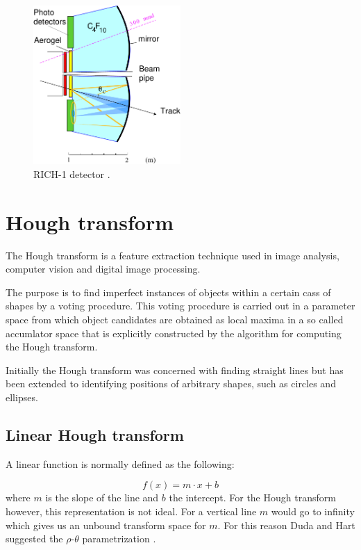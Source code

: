 \documentclass[11pt,twoside]{scrreprt}
\begin{document}
\begin{figure}[tb]
  \centering
  \includegraphics[width=0.5\textwidth]{pics/rich1_schematic}
  \caption{RICH-1 detector \cite{LHCb:2000}.}
  \label{fig:rich1}
\end{figure}



\section{Hough transform} %
\label{sec:hough_transform}

The Hough transform is a feature extraction technique used in image analysis, computer vision and digital image processing.

The purpose is to find imperfect instances of objects within a certain cass of shapes by a voting procedure. This voting procedure is carried out in a parameter space from which object candidates are obtained as local maxima in a so called accumlator space that is explicitly constructed by the algorithm for computing the Hough transform.

Initially the Hough transform was concerned with finding straight lines but has been extended to identifying positions of arbitrary shapes, such as circles and ellipses.

\subsection{Linear Hough transform} %
\label{sub:linear_hough_transform}

A linear function is normally defined as the following:

\[
  f(x) = m\cdot x + b
\]
where $m$ is the slope of the line and $b$ the intercept. For the Hough transform however, this representation is not ideal. For a vertical line $m$ would go to infinity which gives us an unbound transform space for $m$. For this reason Duda and Hart suggested the $\rho\text{-}\theta$ parametrization \parencite{Duda:1972}.
\end{document}
